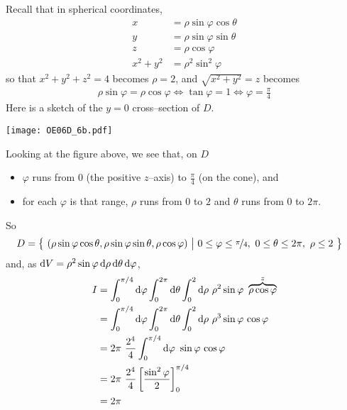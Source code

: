 \begin{solution}
Recall that in spherical coordinates,
\begin{align*}
x&=\rho\sin\varphi\cos\theta \\
y&=\rho\sin\varphi\sin\theta \\
z&=\rho\cos\varphi \\
x^2+y^2 &=\rho^2\sin^2\varphi
\end{align*}
so that $x^2+y^2+z^2= 4$ becomes $\rho = 2$,
and $\sqrt{x^2+y^2}= z$ becomes
\begin{align*}
\rho\sin\varphi = \rho\cos\varphi 
\iff
\tan\varphi= 1
\iff
\varphi=\frac{\pi}{4}
\end{align*}
Here is a sketch of the $y=0$ cross--section of $D$.
\begin{center}
     \texttt{[image: OE06D\_6b.pdf]}
\end{center}
Looking at the figure above, we see that, on $D$
\begin{itemize}
\item 
  $\varphi$ runs from $0$ (the positive $z$--axis) to
    $\frac{\pi}{4}$ (on the cone), and
\item
  for each $\varphi$ is that range, $\rho$ runs from $0$  to $2$
  and $\theta$ runs from $0$ to $2\pi$.
\end{itemize}
So
\begin{align*}
D&=\Set{(\rho\sin\varphi\cos\theta,\rho\sin\varphi\sin\theta,\rho\cos\varphi)}
 {0\le\varphi\le\nicefrac{\pi}{4},\ 
     0\le \theta\le 2\pi,\ \rho\le 2}
\end{align*}
and, as $\mathrm{d}V =\rho^2\sin\varphi\,\mathrm{d}\rho\,\mathrm{d}\theta\,\mathrm{d}\varphi$,
\begin{align*}
I&= \int_0^{\pi/4}\dee{\varphi}\int_0^{2\pi}\dee{\theta}
            \int_0^{2}\dee{\rho}\ 
             \rho^2\sin\varphi\ \overbrace{\rho\cos\varphi}^{z} \\
&= \int_0^{\pi/4}\dee{\varphi}\int_0^{2\pi}\dee{\theta}
            \int_0^{2}\dee{\rho}\ 
                  \rho^3\sin\varphi\,\cos\varphi \\
&= 2\pi\ \frac{2^4}{4} \int_0^{\pi/4}\dee{\varphi}\ \sin\varphi\,\cos\varphi \\
&= 2\pi\ \frac{2^4}{4}\left[\frac{\sin^2\varphi}{2}\right]_0^{\pi/4} \\
&= 2\pi
\end{align*}
\end{solution}

